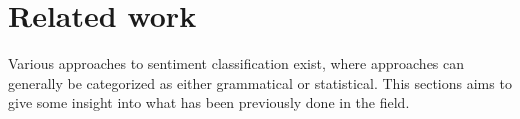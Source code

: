 \documentclass[a4paper,11pt]{kth-mag}
\newcommand{\todo}{ ... }
\begin{document}
%
%
%





\newpage
\section{Related work}
Various approaches to sentiment classification exist, where approaches can generally be categorized as either grammatical\cite{todo} or statistical\cite{todo}. This sections aims to give some insight into what has been previously done in the field.
\end{document}
